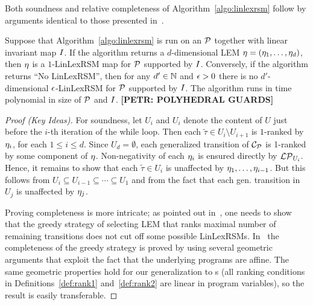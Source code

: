 Both soundness and relative completeness of Algorithm~\ref{algo:linlexrsm} 
follow by arguments identical to those presented 
in~\cite{ADFG10:lexicographic}. 
\begin{theorem}
\label{thm:algo}
	Suppose that Algorithm~\ref{algo:linlexrsm} is run on an \APP{} $\mathcal{P}$ 
	together with linear invariant map $I$. If the algorithm returns a 
	$d$-dimensional LEM $\mathbf{\eta}=(\eta_1,\dots,\eta_d)$, then $\mathbf{\eta}$ 
	is a $1$-LinLexRSM map for $\mathcal{P}$ supported by $I$. Conversely, if 
	the algorithm returns ``No LinLexRSM'', then for any $d'\in \mathbb{N}$ and 
	$\epsilon>0$ there is no $d'$-dimensional $\epsilon$-LinLexRSM for $\mathcal{P}$  
	supported by $I$. The algorithm runs in time polynomial in size of 
	$\mathcal{P}$ and $I$. \textbf{[PETR: POLYHEDRAL GUARDS]}
\end{theorem}
\begin{proof}[Proof (Key Ideas)]
For soundness, let $U_i$ and $U_{i}$ denote the content of $U$ just before the $i$-th iteration of the while loop. Then each $\tilde{\tau}\in U_{i}\setminus U_{i+1}$ is $1$-ranked by $\eta_i$, for each $1\leq i \leq d$. Since $U_{d}=\emptyset$, each generalized transition of $\mathcal{C}_{\mathcal{P}}$ is 1-ranked by some component of $\mathbf{\eta}$. Non-negativity of each $\eta_i$ is ensured directly by $\mathcal{LP}_{U_i}$. Hence, it remains to show that each $\tilde{\tau}\in U_i$ is unaffected by $\eta_1,\dots,\eta_{i-1}$. But this follows from $U_i \subseteq U_{i-1}\subseteq \cdots\subseteq U_1$ and from the fact that each gen. transition in $U_j$ is unaffected by $\eta_j$.

Proving completeness is more intricate; as pointed out in~\cite{ADFG10:lexicographic}, one needs to show that the greedy strategy of selecting LEM that ranks maximal number of remaining transitions does not cut off some possible LinLexRSMs. In~\cite{ADFG10:lexicographic} the completeness of the greedy strategy is proved by using several geometric arguments that exploit the fact that the underlying programs are affine. The same geometric properties hold for our generalization to \APP{}s (all ranking conditions in Definitions~\ref{def:rank1} and~\ref{def:rank2} are linear in program variables), so the result is easily transferable.
\end{proof}

